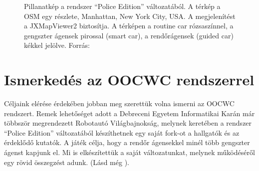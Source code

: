 \documentclass[a4paper,12pt]{report}
\begin{document}
\begin{figure}[h]
\centering
{}
\quad
{}
\caption{Pillanatkép a rendszer ``Police Edition'' változatából. A térkép a OSM egy részlete, Manhattan, New York City, USA. A megjelenítést a JXMapViewer2 \cite{jxmapv} biztosítja. A térképen a routine car rózsaszínnel, a gengszter ágensek pirossal (smart car), a rendőrágensek (guided car) kékkel jelölve. Forrás: \cite{infocomjournal} \label{police}}
\end{figure}

\section{Ismerkedés az OOCWC rendszerrel}

Céljaink elérése érdekében jobban meg szerettük volna ismerni az OOCWC rendszert. Remek lehetőséget adott a Debreceni Egyetem Informatikai Karán már többször megrendezett Robotautó Világbajnokság, melynek keretében a rendszer ``Police Edition'' változatából készíthetnek egy saját fork-ot a hallgatók és az érdeklődő kutatók. A játék célja, hogy a rendőr ágensekkel minél több gengszter ágenst kapjunk el. Mi is elkészítettük a saját változatunkat, melynek működéséről egy rövid összegzést adunk. (Lásd még \cite{forkcoginfocom}).
\end{document}
